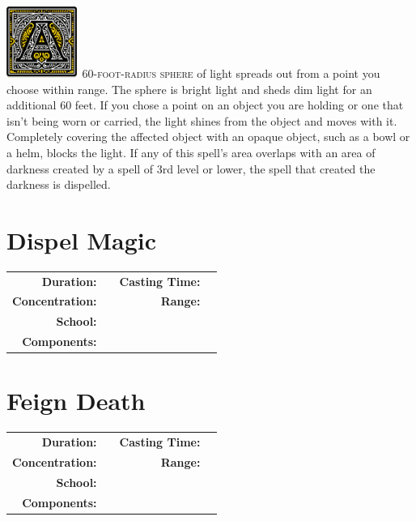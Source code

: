 \documentclass[12pt,showtrims]{memoir}
\begin{document}
\vspace{1\baselineskip}\noindent 
\lettrine[lines=4]{\includegraphics[height=66pt]{initials/A.png}}{\ 60-foot-radius sphere} of light spreads out from a point you choose within range. The sphere is bright light and sheds dim light for an additional 60 feet. If you chose a point on an object you are holding or one that isn't being worn or carried, the light shines from the object and moves with it. Completely covering the affected object with an opaque object, such as a bowl or a helm, blocks the light. If any of this spell's area overlaps with an area of darkness created by a spell of 3rd level or lower, the spell that created the darkness is dispelled.

\newpage
\section*{Dispel Magic}
{
\small\centering\vspace{-6pt}
\begin{tabular}{rlrl}
\toprule

\textbf{Duration:} &  &
\textbf{Casting Time:} &  \\
\textbf{Concentration:} & &
\textbf{Range:} &  \\
\textbf{School:} &  \\
\textbf{Components:} & \multicolumn{3}{p{0.7\textwidth}}{}\\

\bottomrule
\end{tabular}
}
\newpage
\section*{Feign Death}
{
\small\centering\vspace{-6pt}
\begin{tabular}{rlrl}
\toprule

\textbf{Duration:} &  &
\textbf{Casting Time:} &  \\
\textbf{Concentration:} & &
\textbf{Range:} &  \\
\textbf{School:} &  \\
\textbf{Components:} & \multicolumn{3}{p{0.7\textwidth}}{}\\

\bottomrule
\end{tabular}
}
\newpage
\end{document}
